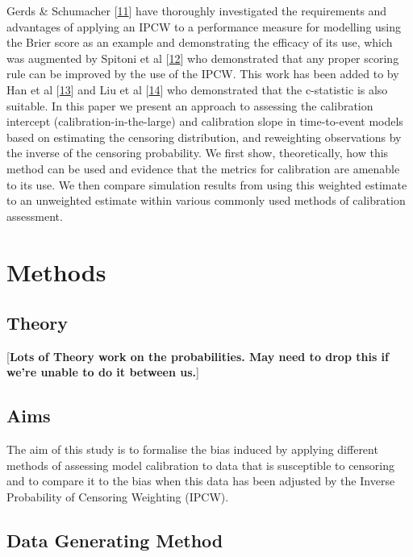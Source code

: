 \documentclass[12pt,PhD,twoside,openright]{muthesis}
\begin{document}
Gerds \& Schumacher {[}\protect\hyperlink{ref-gerds_consistent_2006}{11}{]} have thoroughly investigated the requirements and advantages of applying an IPCW to a performance measure for modelling using the Brier score as an example and demonstrating the efficacy of its use, which was augmented by Spitoni et al {[}\protect\hyperlink{ref-spitoni_prediction_2018}{12}{]} who demonstrated that any proper scoring rule can be improved by the use of the IPCW. This work has been added to by Han et al {[}\protect\hyperlink{ref-han_comparing_2017}{13}{]} and Liu et al {[}\protect\hyperlink{ref-liu_comparing_2016}{14}{]} who demonstrated that the c-statistic is also suitable.
In this paper we present an approach to assessing the calibration intercept (calibration-in-the-large) and calibration slope in time-to-event models based on estimating the censoring distribution, and reweighting observations by the inverse of the censoring probability. We first show, theoretically, how this method can be used and evidence that the metrics for calibration are amenable to its use. We then compare simulation results from using this weighted estimate to an unweighted estimate within various commonly used methods of calibration assessment.

\hypertarget{methods-4}{%
\section{Methods}\label{methods-4}}

\hypertarget{theory}{%
\subsection{Theory}\label{theory}}

{[}\textbf{Lots of Theory work on the probabilities. May need to drop this if we're unable to do it between us.}{]}

\hypertarget{aims}{%
\subsection{Aims}\label{aims}}

The aim of this study is to formalise the bias induced by applying different methods of assessing model calibration to data that is susceptible to censoring and to compare it to the bias when this data has been adjusted by the Inverse Probability of Censoring Weighting (IPCW).

\hypertarget{data-generating-method}{%
\subsection{Data Generating Method}\label{data-generating-method}}
\end{document}
